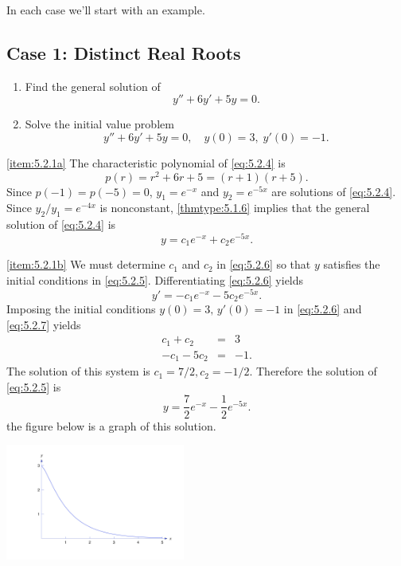 \documentclass{ximera}
\begin{document}
In each case we'll start with an example.

\subsection*{Case 1: Distinct Real Roots}

\begin{example}\label{example:5.2.1}
\begin{enumerate}
    \item \label{item:5.2.1a}%
Find the general solution of
\begin{equation} \label{eq:5.2.4}
y''+6y'+5y=0.
\end{equation}

\item \label{item:5.2.1b}%
Solve the initial value problem
\begin{equation} \label{eq:5.2.5}
y''+6y'+5y=0, \quad   y(0)=3,\;  y'(0)=-1.
\end{equation}
\end{enumerate}

\begin{explanation}
\ref{item:5.2.1a}   The characteristic
polynomial of
 \eqref{eq:5.2.4} is
$$
p(r)=r^2+6r+5=(r+1)(r+5).
$$
Since $p(-1)=p(-5)=0$,  $y_1=e^{-x}$ and $y_2=e^{-5x}$
are solutions of \eqref{eq:5.2.4}. Since $y_2/y_1=e^{-4x}$  is
nonconstant, \ref{thmtype:5.1.6} implies that the general solution
of \eqref{eq:5.2.4} is
\begin{equation} \label{eq:5.2.6}
y=c_1e^{-x}+c_2e^{-5x}.
\end{equation}

\ref{item:5.2.1b} We  must determine $c_1$ and $c_2$
in  \eqref{eq:5.2.6} so that $y$ satisfies the initial conditions in
 \eqref{eq:5.2.5}. Differentiating  \eqref{eq:5.2.6} yields
\begin{equation} \label{eq:5.2.7}
y'=-c_1e^{-x}-5c_2e^{-5x}.
\end{equation}
Imposing the initial conditions $y(0)=3,\, y'(0)=-1$ in \eqref{eq:5.2.6}
and \eqref{eq:5.2.7} yields
$$\begin{array}{rcr}
c_1+c_2 & = & 3\\
-c_1-5c_2 & = & -1.
\end{array}$$
 The solution of this system is $c_1=7/2,c_2=-1/2$.  Therefore
the solution of  \eqref{eq:5.2.5} is
$$
y=\frac{7}{2}e^{-x}-\frac{1}{2}e^{-5x}.
$$
 the figure below is a graph
of this solution.

\begin{image}
 \includegraphics[height=1.5in]{fig050201.jpg}
\end{image}

\end{explanation}
\end{example}
\end{document}
